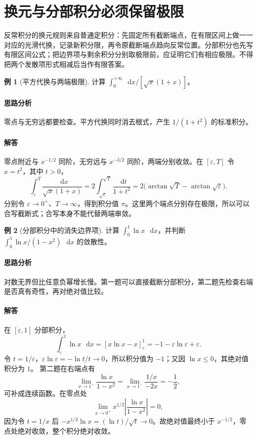 \documentclass[UTF8,fontset=fandol,12pt,oneside,openany]{ctexrep}
\newcommand{\dd}{\mathop{}\!\mathrm d}
\theoremstyle{definition}
\newtheorem{example}{例}[chapter]
\begin{document}
\section{换元与分部积分必须保留极限}
\label{lec:13:calculation}
反常积分的换元规则来自普通定积分：先固定所有截断端点，在有限区间上做一一对应的光滑代换，记录新积分限，再令原截断端点趋向反常位置。分部积分也先写有限区间公式；把边界项与剩余积分分别取极限前，应证明它们有相应极限。不得把两个发散项形式相减后当作有限答案。

\begin{example}[平方代换与两端极限]
计算 $\int_0^{+\infty}\dd x/[\sqrt{x}(1+x)]$。
\end{example}
\paragraph{思路分析} 零点与无穷远都要检查。平方代换同时消去根式，产生 $1/(1+t^2)$ 的标准积分。
\paragraph{解答} 零点附近与 $x^{-1/2}$ 同阶，无穷远与 $x^{-3/2}$ 同阶，两端分别收敛。在 $[\varepsilon,T]$ 令 $x=t^2$，其中 $t>0$，
\[
\int_\varepsilon^T\frac{\dd x}{\sqrt{x}(1+x)}
=2\int_{\sqrt\varepsilon}^{\sqrt T}\frac{\dd t}{1+t^2}
=2\bigl(\arctan\sqrt T-\arctan\sqrt\varepsilon\bigr).
\]
分别令 $\varepsilon\to0^+$、$T\to\infty$，得到积分值 $\pi$。这里两个端点分别存在极限，所以可以合写截断式；合写本身不能代替两端审敛。

\begin{example}[分部积分中的消失边界项]
计算 $\int_0^1\ln x\,\dd x$，并判断 $\int_0^1\ln x/(1-x^2)\,\dd x$ 的敛散性。
\end{example}
\paragraph{思路分析} 对数无界但比任意负幂增长慢。第一题可以直接截断分部积分，第二题先检查右端是否真有奇性，再对绝对值比较。
\paragraph{解答} 在 $[\varepsilon,1]$ 分部积分，
\[
\int_\varepsilon^1\ln x\,\dd x
=[x\ln x-x]_\varepsilon^1
=-1-\varepsilon\ln\varepsilon+\varepsilon.
\]
令 $t=1/\varepsilon$，$\varepsilon\ln\varepsilon=-\ln t/t\to0$，所以积分值为 $-1$；又因 $\ln x\le0$，其绝对值积分为 $1$。
第二题在右端点有
\[
\lim_{x\to1^-}\frac{\ln x}{1-x^2}
=\lim_{x\to1^-}\frac{1/x}{-2x}=-\frac12,
\]
可补成连续函数。在零点处
\[
\lim_{x\to0^+}x^{1/2}\left|\frac{\ln x}{1-x^2}\right|=0,
\]
因为令 $t=1/x$ 后 $-x^{1/2}\ln x=(\ln t)/\sqrt t\to0$。故绝对值最终小于 $x^{-1/2}$，零点处绝对收敛，整个积分绝对收敛。
\end{document}
